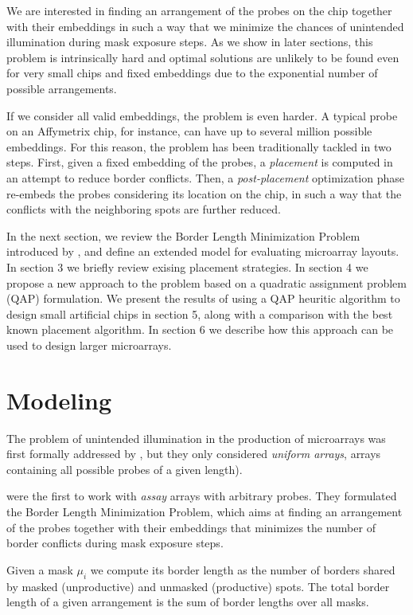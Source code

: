 \documentclass{bioinfo}
\begin{document}
We are interested in finding an arrangement of the probes on the chip together with their embeddings in such a way that we minimize the chances of unintended illumination during mask exposure steps. As we show in later sections, this problem is intrinsically hard and optimal solutions are unlikely to be found even for very small chips and fixed embeddings due to the exponential number of possible arrangements.

If we consider all valid embeddings, the problem is even harder. A typical probe on an Affymetrix chip, for instance, can have up to several million possible embeddings. For this reason, the problem has been traditionally tackled in two steps. First, given a fixed embedding of the probes, a \emph{placement} is computed in an attempt to reduce border conflicts. Then, a \emph{post-placement} optimization phase re-embeds the probes considering its location on the chip, in such a way that the conflicts with the neighboring spots are further reduced.

In the next section, we review the Border Length Minimization Problem introduced by \citealp{HANNENHALLI02}, and define an extended model for evaluating microarray layouts. In section 3 we briefly review exising placement strategies. In section 4 we propose a new approach to the problem based on a quadratic assignment problem (QAP) formulation. We present the results of using a QAP heuritic algorithm to design small artificial chips in section 5, along with a comparison with the best known placement algorithm. In section 6 we describe how this approach can be used to design larger microarrays.

\section{Modeling}

The problem of unintended illumination in the production of microarrays was first formally addressed by \citealp{FELDMAN93}, but they only considered \emph{uniform arrays}, arrays containing all possible probes of a given length).

\citealp{HANNENHALLI02} were the first to work with \emph{assay} arrays with arbitrary probes. They formulated the Border Length Minimization Problem, which aims at finding an arrangement of the probes together with their embeddings that minimizes the number of border conflicts during mask exposure steps.

Given a mask $\mu_{i}$ we compute its border length as the number of borders shared by masked (unproductive) and unmasked (productive) spots. The total border length of a given arrangement is the sum of border lengths over all masks.
\end{document}
